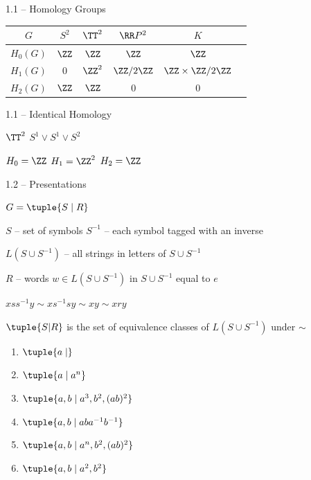\documentclass{beamer}
\theoremstyle{plain}
\begin{document}
\begin{frame}{1.1 -- Homology Groups}
  \begin{center}
    \begin{tabular}{c|ccccc}
      $G$ & $S^2$ & $\TT^2$ & $\RR P^2$ & $K$ \\ \hline
      $H_0(G)$ & $\ZZ$ & $\ZZ$ & $\ZZ$ & $\ZZ$ \\ 
      $H_1(G)$ & $0$ & $\ZZ^2$ & $\ZZ / 2 \ZZ $ & $\ZZ \times \ZZ / 2\ZZ$ \\ 
      $H_2(G)$ & $\ZZ$ & $\ZZ$ & $0$ & $0$ \\ 
    \end{tabular}
\end{center}
\end{frame}

\begin{frame}{1.1 -- Identical Homology}
  \begin{center}
    $\TT^2$ \qquad \qquad $S^1 \vee S^1 \vee S^2$

    $H_0 = \ZZ$ \quad $H_1 = \ZZ^2$ \quad $H_2 = \ZZ$

    \vspace{5cm}
  \end{center}
\end{frame}

\begin{frame}{1.2 -- Presentations}
  \begin{center}
$G = \tuple{S \mid R}$

\pause
    $S$ -- set of symbols \quad $S^{-1}$ -- each symbol tagged with an
    inverse

    \pause
    $L(S \cup S^{-1})$ -- all strings in letters of $S \cup S^{-1}$
   
    \pause
    $R$ -- words $w \in L(S \cup S^{-1})$ in $S \cup S^{-1}$ equal to $e$

    \pause
    $x s s^{-1} y \sim x s^{-1} s y \sim xy \sim x r y$

    \pause
    $\tuple{S | R}$ is the set of equivalence classes of $L(S \cup S^{-1})$
    under $\sim$
    \pause

    \begin{multicols}{2}
      \begin{enumerate}
      \item $\tuple{a \mid }$ 
      \item $\tuple{a \mid a^n}$ 
      \item $\tuple{a, b \mid a^3, b^2, (ab)^2 }$
      \item $\tuple{a, b \mid aba^{-1}b^{-1}}$ 
      \item $\tuple{a, b \mid a^n, b^2, (ab)^2 }$
      \item $\tuple{a, b \mid a^2, b^2}$
    \end{enumerate}
    \end{multicols}
  \end{center}
\end{frame}
\end{document}
